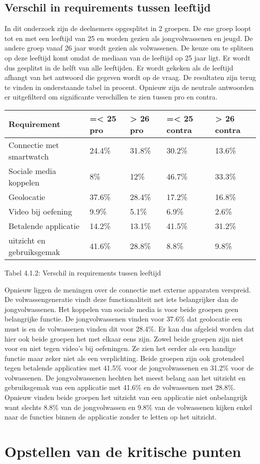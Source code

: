 \subsection{Verschil in requirements tussen leeftijd}
\label{sec:Resultaten vragenlijst}
In dit onderzoek zijn de deelnemers opgesplitst in 2 groepen. De ene groep loopt tot en met een leeftijd van 25 en worden gezien als jongvolwassenen en jeugd. De andere groep vanaf 26 jaar wordt gezien als volwassenen. De keuze om te splitsen op deze leeftijd komt omdat de mediaan van de leeftijd op 25 jaar ligt. Er wordt dus gesplitst in de helft van alle leeftijden. Er wordt gekeken als de leeftijd afhangt van het antwoord die gegeven wordt op de vraag. De resultaten zijn terug te vinden in onderstaande tabel in procent. Opnieuw zijn de neutrale antwoorden er uitgefilterd om significante verschillen te zien tussen pro en contra. 
\begin{center}
\begin{tabular}{ |p{2.5cm}|p{2.3cm}|p{2.3cm}||p{2.8cm}|p{2.9cm}| }
 \hline
     \textbf{Requirement} & \textbf{ =< 25 pro} & \textbf{> 26 pro} & \textbf{=< 25 contra} & \textbf{> 26 contra } \\
 \hline
Connectie met smartwatch   &24.4\%    &31.8\% & 30.2\%    &13.6\%   \\
 \hline
Sociale media koppelen  & 8\%    &12\% & 46.7\%    & 33.3\%   \\
 \hline
 Geolocatie  & 37.6\%    &28.4\% & 17.2\%    & 16.8\%   \\
 \hline
  Video bij oefening  & 9.9\%    &5.1\% & 6.9\%    & 2.6\%   \\
 \hline
   Betalende applicatie  & 14.2\%    &13.1\% &41.5\%    &  31.2\%   \\
 \hline
   uitzicht en gebruiksgemak  & 41.6\%    &28.8\% & 8.8\%    &  9.8\%   \\
 \hline
\end{tabular}
  \caption{Tabel 4.1.2: Verschil in requirements tussen leeftijd}
\end{center}
Opnieuw liggen de meningen over de connectie met externe apparaten verspreid. De volwassengeneratie vindt deze functionaliteit net iets belangrijker dan de jongvolwassenen. Het koppelen van sociale media is voor beide groepen geen belangrijke functie. De jongvolwassenen vinden voor 37.6\% dat geolocatie een must is en de volwassenen vinden dit voor 28.4\%. Er kan dus afgeleid worden dat hier ook beide groepen het met elkaar eens zijn. Zowel beide groepen zijn niet voor en niet tegen video’s bij oefeningen. Ze zien het eerder als een handige functie maar zeker niet als een verplichting. Beide groepen zijn ook grotendeel tegen betalende applicaties met 41.5\% voor de jongvolwassenen en 31.2\% voor de volwassenen. De jongvolwassenen hechten het meest belang aan het uitzicht en gebruiksgemak van een applicatie met 41.6\% en de volwassenen met 28.8\%. Opnieuw vinden beide groepen het uitzicht van een applicatie niet onbelangrijk want slechts 8.8\% van de jongvolwassen en 9.8\% van de volwassenen kijken enkel naar de functies binnen de applicatie zonder te letten op het uitzicht. 

\newpage
\section{Opstellen van de kritische punten}
\label{sec:Resultaten vragenlijst}